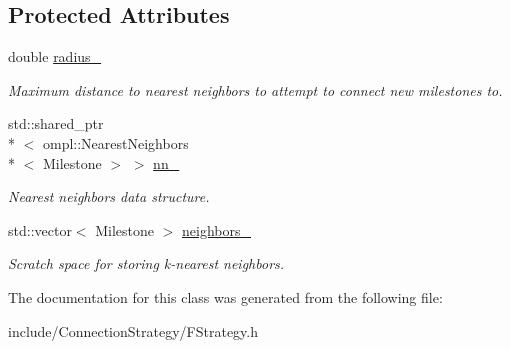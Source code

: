 \subsection*{Protected Attributes}
\begin{DoxyCompactItemize}
\item 
\hypertarget{class_f_strategy_a8a605936e6cfd37fd6c5c2d3c1f0c784}{double \hyperlink{class_f_strategy_a8a605936e6cfd37fd6c5c2d3c1f0c784}{radius\-\_\-}}\label{class_f_strategy_a8a605936e6cfd37fd6c5c2d3c1f0c784}

\begin{DoxyCompactList}\small\item\em Maximum distance to nearest neighbors to attempt to connect new milestones to. \end{DoxyCompactList}\item 
\hypertarget{class_f_strategy_ae35c08d00fb6489c36f401b13fce046a}{std\-::shared\-\_\-ptr\\*
$<$ ompl\-::\-Nearest\-Neighbors\\*
$<$ Milestone $>$ $>$ \hyperlink{class_f_strategy_ae35c08d00fb6489c36f401b13fce046a}{nn\-\_\-}}\label{class_f_strategy_ae35c08d00fb6489c36f401b13fce046a}

\begin{DoxyCompactList}\small\item\em Nearest neighbors data structure. \end{DoxyCompactList}\item 
\hypertarget{class_f_strategy_a3cd93caf2fd4d18f8033f02eeeab0b39}{std\-::vector$<$ Milestone $>$ \hyperlink{class_f_strategy_a3cd93caf2fd4d18f8033f02eeeab0b39}{neighbors\-\_\-}}\label{class_f_strategy_a3cd93caf2fd4d18f8033f02eeeab0b39}

\begin{DoxyCompactList}\small\item\em Scratch space for storing k-\/nearest neighbors. \end{DoxyCompactList}\end{DoxyCompactItemize}


The documentation for this class was generated from the following file\-:\begin{DoxyCompactItemize}
\item 
include/\-Connection\-Strategy/F\-Strategy.\-h\end{DoxyCompactItemize}
